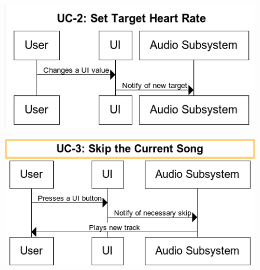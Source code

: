 \documentclass[letterpaper,english, 12pt]{scrreprt}
\begin{document}
\begin{figure}[H]
        \centering
        \includegraphics[width=\textwidth]{img/ssd/ssd_uc2.png}\\
\end{figure}

\begin{figure}[H]
        \centering
        \includegraphics[width=\textwidth]{img/ssd/ssd_uc3.png}\\
\end{figure}
\end{document}
